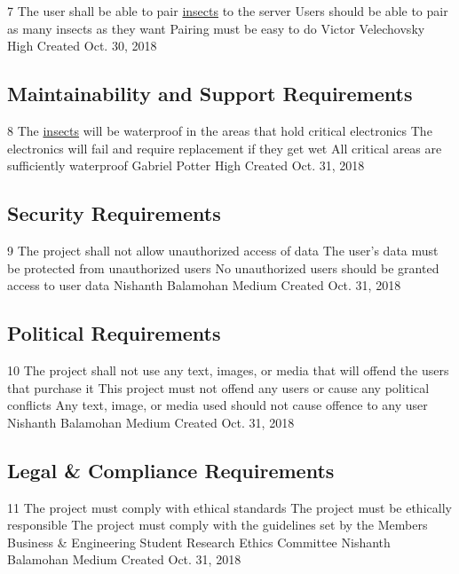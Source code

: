 \documentclass[11pt]{article}
\begin{document}
\nonFunctionalRequirement
{7}
{The user shall be able to pair \hyperref[sec:definitions]{insects}
to the server}
{Users should be able to pair as many insects as they want}
{Pairing must be easy to do}
{Victor Velechovsky}
{High}
{Created Oct. 30, 2018}

\subsection{Maintainability and Support Requirements}

\nonFunctionalRequirement
{8}
{The \hyperref[sec:definitions]{insects} will be waterproof in the areas that hold critical electronics}
{The electronics will fail and require replacement if they get wet}
{All critical areas are sufficiently waterproof}
{Gabriel Potter}
{High}
{Created Oct. 31, 2018}

\subsection{Security Requirements}

\nonFunctionalRequirement
{9}
{The project shall not allow unauthorized access of data}
{The user's data must be protected from unauthorized users}
{No unauthorized users should be granted access to user data}
{Nishanth Balamohan}
{Medium}
{Created Oct. 31, 2018}

\subsection{Political Requirements}

\nonFunctionalRequirement
{10}
{The project shall not use any text, images, or media that will
offend the users that purchase it}
{This project must not offend any users or cause any political conflicts}
{Any text, image, or media used should not cause offence to any user}
{Nishanth Balamohan}
{Medium}
{Created Oct. 31, 2018}

\subsection{Legal \& Compliance Requirements}

\nonFunctionalRequirement
{11}
{The project must comply with ethical standards}
{The project must be ethically responsible}
{The project must comply with the guidelines set by the Members Business \& Engineering Student Research Ethics Committee}
{Nishanth Balamohan}
{Medium}
{Created Oct. 31, 2018}
\end{document}
